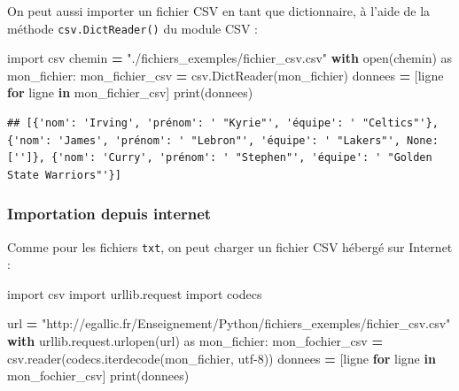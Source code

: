 \documentclass[
  12pt,
]{book}
\newenvironment{Shaded}{\begin{snugshade}}{\end{snugshade}}
\newcommand{\BuiltInTok}[1]{#1}
\newcommand{\ControlFlowTok}[1]{\textcolor[rgb]{0.13,0.29,0.53}{\textbf{#1}}}
\newcommand{\ImportTok}[1]{#1}
\newcommand{\KeywordTok}[1]{\textcolor[rgb]{0.13,0.29,0.53}{\textbf{#1}}}
\newcommand{\NormalTok}[1]{#1}
\newcommand{\OperatorTok}[1]{\textcolor[rgb]{0.81,0.36,0.00}{\textbf{#1}}}
\newcommand{\StringTok}[1]{\textcolor[rgb]{0.31,0.60,0.02}{#1}}
\numberwithin{equation}{section}
\numberwithin{countremarque}{section}
\begin{document}
On peut aussi importer un fichier CSV en tant que dictionnaire, à l'aide de la méthode \texttt{csv.DictReader()} du module CSV :

\begin{Shaded}
\begin{Highlighting}[]
\ImportTok{import}\NormalTok{ csv}
\NormalTok{chemin }\OperatorTok{=} \StringTok{"./fichiers\_exemples/fichier\_csv.csv"}
\ControlFlowTok{with} \BuiltInTok{open}\NormalTok{(chemin) }\ImportTok{as}\NormalTok{ mon\_fichier:}
\NormalTok{    mon\_fichier\_csv }\OperatorTok{=}\NormalTok{ csv.DictReader(mon\_fichier)}
\NormalTok{    donnees }\OperatorTok{=}\NormalTok{ [ligne }\ControlFlowTok{for}\NormalTok{ ligne }\KeywordTok{in}\NormalTok{ mon\_fichier\_csv]}
\BuiltInTok{print}\NormalTok{(donnees)}
\end{Highlighting}
\end{Shaded}

\begin{lstlisting}
## [{'nom': 'Irving', 'prénom': ' "Kyrie"', 'équipe': ' "Celtics"'}, {'nom': 'James', 'prénom': ' "Lebron"', 'équipe': ' "Lakers"', None: ['']}, {'nom': 'Curry', 'prénom': ' "Stephen"', 'équipe': ' "Golden State Warriors"'}]
\end{lstlisting}

\subsubsection{Importation depuis internet}\label{importation-depuis-internet-1}

Comme pour les fichiers \texttt{txt}, on peut charger un fichier CSV hébergé sur Internet :

\begin{Shaded}
\begin{Highlighting}[]
\ImportTok{import}\NormalTok{ csv}
\ImportTok{import}\NormalTok{ urllib.request}
\ImportTok{import}\NormalTok{ codecs}

\NormalTok{url }\OperatorTok{=} \StringTok{"http://egallic.fr/Enseignement/Python/fichiers\_exemples/fichier\_csv.csv"}
\ControlFlowTok{with}\NormalTok{ urllib.request.urlopen(url) }\ImportTok{as}\NormalTok{ mon\_fichier:}
\NormalTok{    mon\_fochier\_csv }\OperatorTok{=}\NormalTok{ csv.reader(codecs.iterdecode(mon\_fichier, }\StringTok{\textquotesingle{}utf{-}8\textquotesingle{}}\NormalTok{))}
\NormalTok{    donnees }\OperatorTok{=}\NormalTok{ [ligne }\ControlFlowTok{for}\NormalTok{ ligne }\KeywordTok{in}\NormalTok{ mon\_fochier\_csv]}
\BuiltInTok{print}\NormalTok{(donnees)}
\end{Highlighting}
\end{Shaded}
\end{document}
